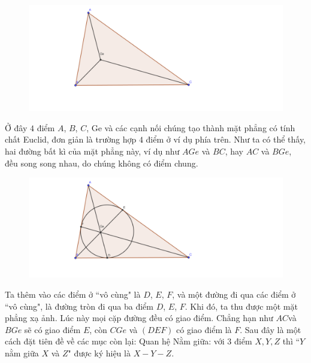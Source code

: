 \begin{multicols}{2}
	\begin{figure}[H]
		\vspace*{-5pt}
		\centering
		\captionsetup{labelformat= empty, justification=centering}
		\includegraphics[width= 1\linewidth]{Mặt phẳng xạ ảnh hữu hạn 1.pdf}
		\vspace*{-10pt}
	\end{figure}
	Ở đây $4$ điểm $A$, $B$, $C$, Ge và các cạnh nối chúng tạo thành mặt phẳng có tính chất Euclid, đơn giản là trường hợp $4$ điểm ở ví dụ phía trên. 
	Như ta có thể thấy, hai đường bất kì của mặt phẳng này, ví dụ như $AGe$ và $BC$, hay $AC$ và $BGe$, đều song song nhau, do chúng không có điểm chung. 
	\begin{figure}[H]
		\vspace*{-5pt}
		\centering
		\captionsetup{labelformat= empty, justification=centering}
		\includegraphics[width= 1\linewidth]{Mặt phẳng xạ ảnh hữu hạn 2.pdf}
		\vspace*{-10pt}
	\end{figure}
	Ta thêm vào các điểm ở ``vô cùng" là $D$, $E$, $F$, và một đường đi qua các điểm ở ``vô cùng", là đường tròn đi qua ba điểm $D$, $E$, $F$. Khi đó, ta thu được một mặt phẳng xạ ảnh. Lúc này mọi cặp đường đều có giao điểm. Chẳng hạn như $AC$và $BGe$ sẽ có giao điểm $E$, còn $CGe$ và $(DEF)$ có giao điểm là $F$.
	\vskip 0.1cm
	Sau đây là một cách đặt tiên đề về các mục còn lại: 
	\vskip 0.1cm
	Quan hệ Nằm giữa: với $3$ điểm $X, Y, Z$ thì ``$Y$ nằm giữa $X$ và $Z$" được ký hiệu là $X-Y-Z$.

\end{multicols}
